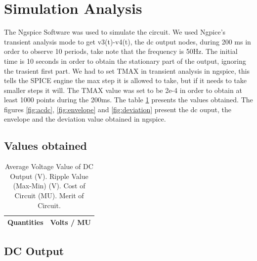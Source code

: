 \section{Simulation Analysis}
\label{sec:simulation}
The Ngspice Software was used to simulate the circuit.
We used Ngpice’s transient analysis mode to get v3(t)-v4(t), the dc output nodes, during 200 ms in order to observe 10 periods, take note that the frequency is 50Hz.
The initial time is 10 seconds in order to obtain the stationary part of the output, ignoring the trasient first part.
We had to set TMAX in transient analysis in ngspice, 
this tells the SPICE engine the max step it is allowed to take, but if it needs to take smaller steps it will.
The TMAX value was set to be 2e-4 in order to obtain at least 1000 points during the 200ms.
The table \ref{tab:simvalues} presents the values obtained.
The figures \ref{fig:acdc}, \ref{fig:envelope} and \ref{fig:deviation} present the dc ouput, the envelope
and the deviation value obtained in ngspice.

\vspace{10mm}

\subsection{Values obtained}

\vspace{10mm}

\begin{table}[ht]
  \centering
  \begin{tabular}{|c|c|}
    \hline    
    {\bf Quantities} & {\bf Volts / MU} \\ \hline
    
  \end{tabular}
  \vspace{10mm}
  \caption{Average Voltage Value of DC Output (V). Ripple Value (Max-Min) (V). Cost of Circuit (MU). Merit of Circuit.}
  \label{tab:simvalues}
\end{table}


\newpage


\subsection{DC Output}

